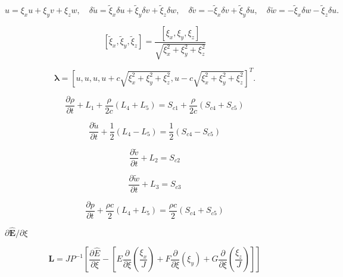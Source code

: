 \documentclass{article}
\begin{document}
\[ \begin{equation*} u=\xi_x u +\xi_y v+\xi_z w, \quad \delta \tilde{u}=\tilde{\xi}_x \delta u+ \tilde{\xi}_y \delta v+\tilde{\xi}_z \delta w, \quad \delta \tilde{v}=-\tilde{\xi}_x \delta v +\tilde{\xi}_y \delta u, \quad \delta \tilde{w}=-\tilde{\xi}_x \delta w -\tilde{\xi}_z \delta u. \end{equation*} \]
\pagebreak

\[ \begin{equation*} \left[\tilde{\xi}_x,\tilde{\xi}_y,\tilde{\xi}_z\right]=\frac{\left[\xi_x, \xi_y, \xi_z \right]}{\sqrt{\xi_x^2+\xi_y^2+\xi_z^2}} \end{equation*} \]
\pagebreak

\[ \begin{equation*} \mathbf{\lambda}=\left[u,u,u,u+c\sqrt{\xi_x^2+\xi_y^2+\xi_z^2},u-c\sqrt{\xi_x^2+\xi_y^2+\xi_z^2}\right]^T. \end{equation*} \]
\pagebreak

\[ \begin{equation*} \frac{\partial \rho}{\partial t}+L_1+\frac{\rho}{2c}(L_4+L_5)=S_{c1}+\frac{\rho}{2c}(S_{c4}+S_{c5}) \end{equation*} \]
\pagebreak

\[ \begin{equation*} \frac{\partial \tilde{u}}{\partial t}+\frac{1}{2}(L_4-L_5)=\frac{1}{2}(S_{c4}-S_{c5}) \end{equation*} \]
\pagebreak

\[ \begin{equation*} \frac{\partial \tilde{v}}{\partial t}+L_2=S_{c2} \end{equation*} \]
\pagebreak

\[ \begin{equation*} \frac{\partial \tilde{w}}{\partial t}+L_3=S_{c3} \end{equation*} \]
\pagebreak

\[ \begin{equation*} \frac{\partial p}{\partial t}+\frac{\rho c}{2}(L_4+L_5)=\frac{\rho c}{2}(S_{c4}+S_{c5}) \end{equation*} \]
\pagebreak

$\partial \hat{\mathbf{E}}/\partial \xi$
\pagebreak

\[ \begin{equation*} \mathbf{L}=J P^{-1}\left[\frac{\partial \hat{E}}{\partial \xi}-\left[E\frac{\partial}{\partial \xi}\left(\frac{\xi_x}{J}\right)+F \frac{\partial}{\partial \xi}\left( \xi_y\right)+G \frac{\partial}{\partial \xi}\left(\frac{\xi_z}{J}\right) \right]\right] \end{equation*} \]
\pagebreak
\end{document}
